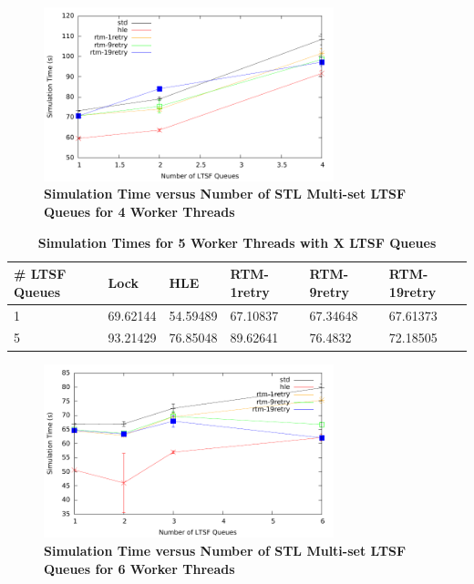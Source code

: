 \documentclass[11pt]{book}
\begin{document}
\begin{figure}[H]
    \centering
    \graphicspath{ {./figures/} }
    \includegraphics[width=0.75\textwidth,keepaspectratio]{hugeepidemicsim-NOmig-timeVSschedQs-multiset-4thread}
    \caption{\textbf{Simulation Time versus Number of STL Multi-set LTSF Queues for 4
        Worker Threads}}\label{fig:noThrMig_timeVSschq_4threads}
\end{figure}

\begin{table}[H]
    \centering
    \begin{tabular}{l|p{2cm}|p{2cm}|p{2cm}|p{2cm}|p{2cm}}
        \textbf{\# LTSF Queues}&Lock &HLE &RTM-1retry &RTM-9retry &RTM-19retry \\
        \hline
        \midrule
            1 &69.62144  &54.59489 &67.10837 &67.34648 &67.61373\\ 
            5 &93.21429  &76.85048 &89.62641 &76.4832  &72.18505\\
    \end{tabular}
    \caption{\textbf{Simulation Times for 5 Worker Threads with X LTSF
        Queues}}\label{tab:noThrMig_5threadsXschq}
\end{table}

\begin{figure}[H]
    \centering
    \graphicspath{ {./figures/} }
    \includegraphics[width=0.75\textwidth,keepaspectratio]{hugeepidemicsim-NOmig-timeVSschedQs-multiset-6thread}
    \caption{\textbf{Simulation Time versus Number of STL Multi-set LTSF Queues for 6
        Worker Threads}}\label{fig:noThrMig_timeVSschq_6threads}
\end{figure}
\end{document}
